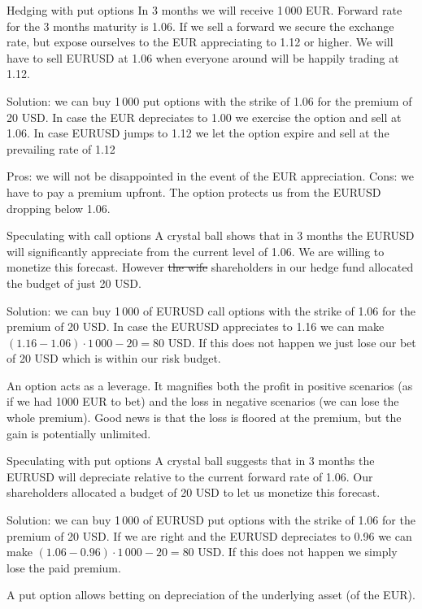 \documentclass{beamer}
\begin{document}
\begin{frame}{Hedging with put options}
\justify
In 3 months we will receive 1\,000 EUR. Forward rate for the 3 months maturity is 1.06. If we sell a forward we secure the exchange rate, but expose ourselves to the EUR appreciating to 1.12 or higher. We will have to sell EURUSD at 1.06 when everyone around will be happily trading at 1.12.

\justify
Solution: we can buy 1\,000 put options with the strike of 1.06 for the premium of 20 USD. In case the EUR depreciates to 1.00 we exercise the option and sell at 1.06. In case EURUSD jumps to 1.12 we let the option expire and sell at the prevailing rate of 1.12

\justify
Pros: we will not be disappointed in the event of the EUR appreciation. Cons: we have to pay a premium upfront. The option protects us from the EURUSD dropping below 1.06.
\end{frame}



\begin{frame}{Speculating with call options}
\justify
A crystal ball shows that in 3 months the EURUSD will significantly \alert{appreciate} from the current level of 1.06. We are willing to monetize this forecast. However \sout{the wife} shareholders in our hedge fund allocated the budget of just 20 USD.

\justify
Solution: we can buy 1\,000 of EURUSD \alert{call} options with the strike of 1.06 for the premium of 20 USD. In case the EURUSD appreciates to 1.16 we can make $(1.16 - 1.06) \cdot 1\,000 - 20 = 80$ USD. If this does not happen we just lose our bet of 20 USD which is within our risk budget.

\justify
An option acts as a leverage. It magnifies both the profit in positive scenarios (as if we had 1000 EUR to bet) and the loss in negative scenarios (we can lose the whole premium). Good news is that the loss is floored at the premium, but the gain is potentially unlimited.
\end{frame}



\begin{frame}{Speculating with put options}
\justify
A crystal ball suggests that in 3 months the EURUSD will \alert{depreciate} relative to the current forward rate of 1.06. Our shareholders allocated a budget of 20 USD to let us monetize this forecast.

\justify
Solution: we can buy 1\,000 of EURUSD \alert{put} options with the strike of 1.06 for the premium of 20 USD. If we are right and the EURUSD depreciates to 0.96 we can make $(1.06 - 0.96)\cdot1\,000 - 20 = 80$ USD. If this does not happen we simply lose the paid premium.

\justify
A put option allows betting on depreciation of the underlying asset (of the EUR).
\end{frame}
\end{document}
